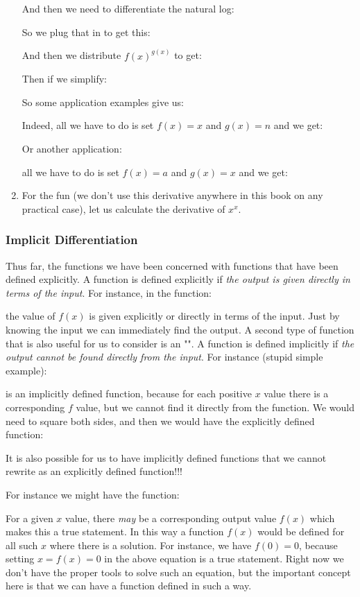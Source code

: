 \begin{enumerate}
			And then we need to differentiate the natural log:
			
		  	So we plug that in to get this:
			
			And then we distribute $f(x)^{g(x)}$ to get:
			
			Then if we simplify:
			
			So some application examples give us:
			
		   	Indeed, all we have to do is set $f(x) = x$ and $g(x) = n$ and we get:
		   	
			Or another application:
			
		   all we have to do is set $f(x) = a$ and $g(x) = x$ and we get:
			
			
			
			\item For the fun (we don't use this derivative anywhere in this book on any practical case), let us calculate the derivative of $x^x$.
			
		 \end{enumerate}
		 
		 \pagebreak
		\subsubsection{Implicit Differentiation}
	Thus far, the functions we have been concerned with functions that have been defined explicitly. A function is defined explicitly if {\it the output is given directly in terms of the input}. For instance, in the function:
		
	the value of $f(x)$ is given explicitly or directly in terms of the input. Just by knowing the input we can immediately find the output. A second type of function that is also useful for us to consider is an "". A function is defined implicitly if {\it the output cannot be found directly from the input}. For instance (stupid simple example):
	
	 is an implicitly defined function, because for each positive $x$ value there is a corresponding $f$ value, but we cannot find it directly from the function. We would need to square both sides, and then we would have the explicitly defined function:
	 	
	It is also possible for us to have implicitly defined functions that we cannot rewrite as an explicitly defined function!!! 
	
	For instance we might have the function:
	
	For a given $x$ value, there {\it may} be a corresponding output value $f(x)$ which makes this a true statement. In this way a function $f(x)$ would be defined for all such $x$ where there is a solution. For instance, we have $f(0) = 0$, because setting $x=f(x)=0$ in the above equation is a true statement. Right now we don't have the proper tools to solve such an equation, but the important concept here is that we can have a function defined in such a way. 
	
